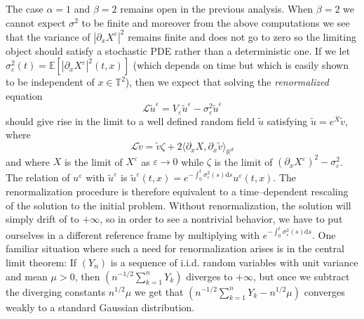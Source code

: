 \documentclass[a4paper,11pt]{article}
\newcommand{\mathd}{\mathrm{d}}
\newcommand{\tmem}[1]{{\em #1\/}}
\newcommand{\LL}{\mathscr{L}}
\begin{document}
The case $\alpha = 1$ and $\beta = 2$ remains open in the previous analysis.  When
$\beta = 2$ we cannot expect $\sigma^2$ to be finite and moreover from the above
computations we see that the variance of $| \partial_x X^{\varepsilon} |^2$
remains finite and does not go to zero so the limiting object should satisfy a
stochastic PDE rather than a deterministic one. If we let
$\sigma^2_{\varepsilon} (t) =\mathbb{E} [| \partial_x X^{\varepsilon} |^2 (t,
x)]$ (which depends on time but which is easily shown to be independent of $x
\in \mathbb{T}^2$), then we expect that solving the {\tmem{renormalized}}
equation
\[ \LL \tilde{u}^{\varepsilon} = V_{\varepsilon} \tilde{u}^{\varepsilon} -
   \sigma^2_{\varepsilon} \tilde{u}^{\varepsilon} \]
should give rise in the limit to a well defined random field $\tilde{u}$
satisfying $\tilde{u} = e^X \tilde{v}$, where
\[ \LL \tilde{v} = \tilde{v} \zeta + 2 \langle \partial_x X, \partial_x
   \tilde{v} \rangle_{\mathbb{R}^d} \]
and where $X$ is the limit of $X^{\varepsilon}$ as $\varepsilon \rightarrow 0$
while $\zeta$ is the limit of $(\partial_x X^{\varepsilon})^2 -
\sigma^2_{\varepsilon} $. The relation of $u^{\varepsilon}$ with
$\tilde{u}^{\varepsilon}$ is $\tilde{u}^{\varepsilon} (t, x)
= e^{- \int_0^t \sigma^2_{\varepsilon} (s) \mathd s} u^{\varepsilon} (t, x)$.
The renormalization procedure is therefore equivalent to a time--dependent
rescaling of the solution to the initial problem. Without renormalization, the solution will simply drift of to $+\infty$, so in order to see a nontrivial behavior, we have to put ourselves in a different reference frame by multiplying with $ e^{- \int_0^t \sigma^2_{\varepsilon} (s) \mathd s}$. One familiar situation where such a need for renormalization arises is in the central limit theorem: If $(Y_n)$ is a sequence of i.i.d. random variables with unit variance and mean $\mu > 0$, then $(n^{-1/2} \sum_{k=1}^n Y_k)$ diverges to $+\infty$, but once we subtract the diverging constants $n^{1/2} \mu$ we get that $(n^{-1/2} \sum_{k=1}^n Y_k - n^{1/2}\mu)$ converges weakly to a standard Gaussian distribution.
\end{document}
